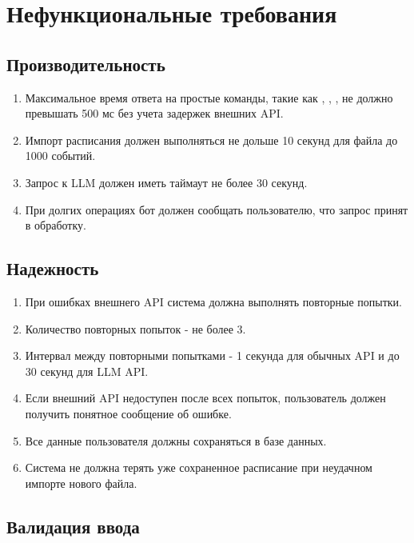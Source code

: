\documentclass[10pt,a4paper,final]{article} %
\begin{document}
\section{Нефункциональные требования}

\subsection{Производительность}

\begin{enumerate}[label=\arabic*.]
    \item Максимальное время ответа на простые команды, такие как , , , не должно превышать 500 мс без учета задержек внешних API.
    \item Импорт расписания должен выполняться не дольше 10 секунд для файла до 1000 событий.
    \item Запрос к LLM должен иметь таймаут не более 30 секунд.
    \item При долгих операциях бот должен сообщать пользователю, что запрос принят в обработку.
\end{enumerate}

\subsection{Надежность}

\begin{enumerate}[label=\arabic*.]
    \item При ошибках внешнего API система должна выполнять повторные попытки.
    \item Количество повторных попыток - не более 3.
    \item Интервал между повторными попытками - 1 секунда для обычных API и до 30 секунд для LLM API.
    \item Если внешний API недоступен после всех попыток, пользователь должен получить понятное сообщение об ошибке.
    \item Все данные пользователя должны сохраняться в базе данных.
    \item Система не должна терять уже сохраненное расписание при неудачном импорте нового файла.
\end{enumerate}

\subsection{Валидация ввода}
\end{document}
